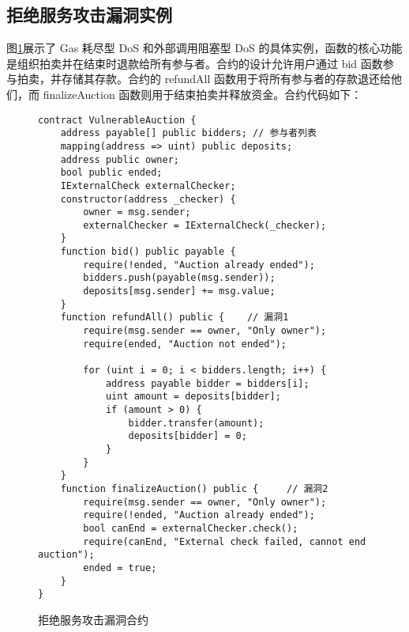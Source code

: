 \documentclass[print, master, vlined, timesmath]{DissertUESTC}
\begin{document}

\subsection{拒绝服务攻击漏洞实例}
图\ref{fig:拒绝服务攻击漏洞合约}展示了 Gas 耗尽型 DoS 和外部调用阻塞型 DoS 的具体实例，函数的核心功能是组织拍卖并在结束时退款给所有参与者。合约的设计允许用户通过 bid 函数参与拍卖，并存储其存款。合约的 refundAll 函数用于将所有参与者的存款退还给他们，而 finalizeAuction 函数则用于结束拍卖并释放资金。合约代码如下：


\begin{figure}
    \centering
    \begin{minipage}{0.9\textwidth}
    \begin{verbatim}
contract VulnerableAuction {
    address payable[] public bidders; // 参与者列表
    mapping(address => uint) public deposits;
    address public owner;
    bool public ended;
    IExternalCheck externalChecker;
    constructor(address _checker) {
        owner = msg.sender;
        externalChecker = IExternalCheck(_checker);
    }
    function bid() public payable {
        require(!ended, "Auction already ended");
        bidders.push(payable(msg.sender));
        deposits[msg.sender] += msg.value;
    }
    function refundAll() public {    // 漏洞1
        require(msg.sender == owner, "Only owner");
        require(ended, "Auction not ended");

        for (uint i = 0; i < bidders.length; i++) {
            address payable bidder = bidders[i];
            uint amount = deposits[bidder];
            if (amount > 0) {
                bidder.transfer(amount);
                deposits[bidder] = 0;
            }
        }
    }
    function finalizeAuction() public {     // 漏洞2
        require(msg.sender == owner, "Only owner");
        require(!ended, "Auction already ended");
        bool canEnd = externalChecker.check();
        require(canEnd, "External check failed, cannot end auction");
        ended = true;
    }
}
    \end{verbatim}
    \end{minipage}
    \caption{拒绝服务攻击漏洞合约}
    \label{fig:拒绝服务攻击漏洞合约}
\end{figure}
\end{document}

